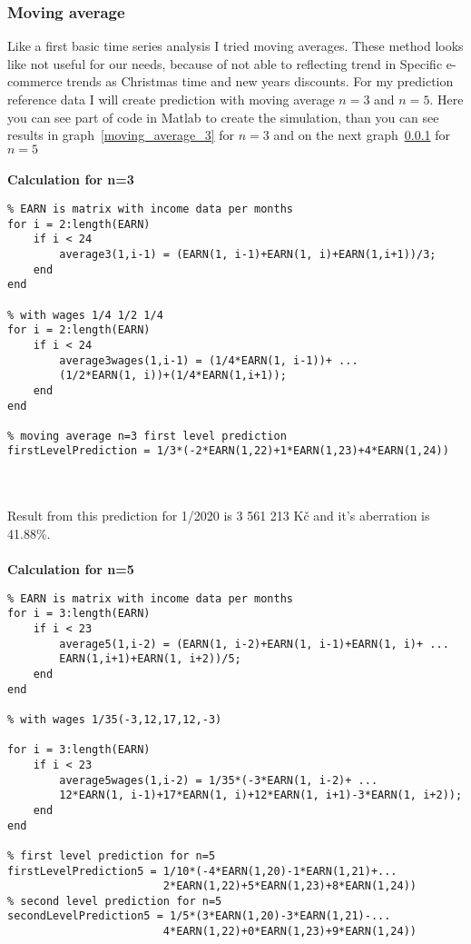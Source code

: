 \subsubsection{Moving average}
Like a first basic time series analysis I tried moving averages.
These method looks like not useful for our needs, because of not able to reflecting trend in
Specific e-commerce trends as Christmas time and new years discounts.
For my prediction reference data I will create prediction with moving average $n=3$ and $n=5$.
Here you can see part of code in Matlab to create the simulation, than you can see results in graph~\ref{moving_average_3}
for $n=3$ and on the next graph~\ref{} for $n=5$\\
\\
\textbf{Calculation for n=3}\\
\begin{lstlisting}[language=mcode]
% generate matrix for moving average n=3
% EARN is matrix with income data per months
for i = 2:length(EARN)
    if i < 24
        average3(1,i-1) = (EARN(1, i-1)+EARN(1, i)+EARN(1,i+1))/3;
    end
end

% with wages 1/4 1/2 1/4
for i = 2:length(EARN)
    if i < 24
        average3wages(1,i-1) = (1/4*EARN(1, i-1))+ ...
        (1/2*EARN(1, i))+(1/4*EARN(1,i+1));
    end
end

% moving average n=3 first level prediction
firstLevelPrediction = 1/3*(-2*EARN(1,22)+1*EARN(1,23)+4*EARN(1,24))
\end{lstlisting}\\
\\
Result from this prediction for 1/2020 is 3 561 213 Kč and it's aberration is 41.88\%.\\
\\
\textbf{Calculation for n=5}\\
\begin{lstlisting}[language=mcode]
% generate matrix for moving average n=5
% EARN is matrix with income data per months
for i = 3:length(EARN)
    if i < 23
        average5(1,i-2) = (EARN(1, i-2)+EARN(1, i-1)+EARN(1, i)+ ...
        EARN(1,i+1)+EARN(1, i+2))/5;
    end
end

% with wages 1/35(-3,12,17,12,-3)

for i = 3:length(EARN)
    if i < 23
        average5wages(1,i-2) = 1/35*(-3*EARN(1, i-2)+ ...
        12*EARN(1, i-1)+17*EARN(1, i)+12*EARN(1, i+1)-3*EARN(1, i+2));
    end
end

% first level prediction for n=5
firstLevelPrediction5 = 1/10*(-4*EARN(1,20)-1*EARN(1,21)+...
                        2*EARN(1,22)+5*EARN(1,23)+8*EARN(1,24))
% second level prediction for n=5
secondLevelPrediction5 = 1/5*(3*EARN(1,20)-3*EARN(1,21)-...
                        4*EARN(1,22)+0*EARN(1,23)+9*EARN(1,24))
\end{lstlisting}\\
